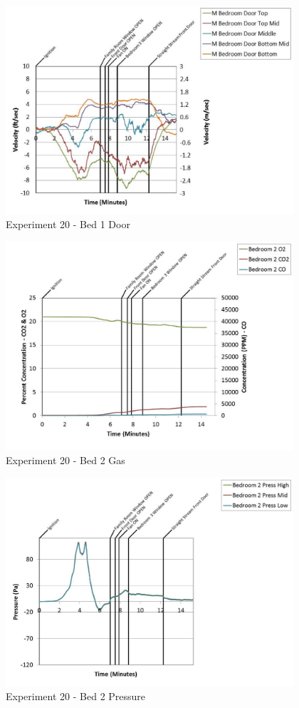 \documentclass{article}
\begin{document}
\begin{appendices}
	\clearpage

	\begin{figure}[h!]
		\centering
		\includegraphics[height=3.05in]{0_Images/Results_Charts/Exp_20_Charts/Bed1Door.pdf}
		\caption{Experiment 20 - Bed 1 Door}
	\end{figure}
 

	\begin{figure}[h!]
		\centering
		\includegraphics[height=3.05in]{0_Images/Results_Charts/Exp_20_Charts/Bed2Gas.pdf}
		\caption{Experiment 20 - Bed 2 Gas}
	\end{figure}
 
	\clearpage

	\begin{figure}[h!]
		\centering
		\includegraphics[height=3.05in]{0_Images/Results_Charts/Exp_20_Charts/Bed2Pressure.pdf}
		\caption{Experiment 20 - Bed 2 Pressure}
	\end{figure}
 


\end{appendices}
\end{document}

